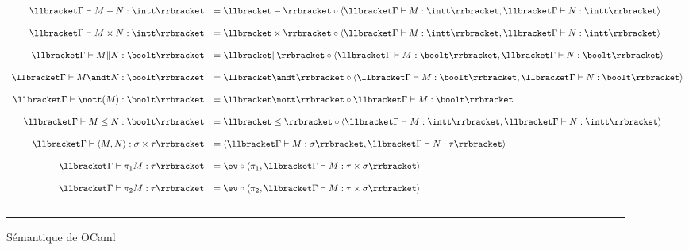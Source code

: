 \begin{figure}[p]
$$\begin{array}{rl}
        \llbracket\Gamma\vdash M - N : \intt\rrbracket &= \llbracket-\rrbracket \circ \langle\llbracket\Gamma\vdash M : \intt\rrbracket,\llbracket\Gamma\vdash N : \intt\rrbracket\rangle\\ \\
        \llbracket\Gamma\vdash M \times N : \intt\rrbracket &= \llbracket\times\rrbracket \circ \langle\llbracket\Gamma\vdash M : \intt\rrbracket,\llbracket\Gamma\vdash N : \intt\rrbracket\rangle\\ \\
        \llbracket\Gamma\vdash M \| N : \boolt\rrbracket &= \llbracket\|\rrbracket \circ \langle\llbracket\Gamma\vdash M : \boolt\rrbracket,\llbracket\Gamma\vdash N : \boolt\rrbracket\rangle\\ \\
        \llbracket\Gamma\vdash M \andt N : \boolt\rrbracket &= \llbracket\andt\rrbracket \circ \langle\llbracket\Gamma\vdash M : \boolt\rrbracket,\llbracket\Gamma\vdash N : \boolt\rrbracket\rangle\\ \\
        \llbracket\Gamma\vdash \nott (M) : \boolt\rrbracket &= \llbracket\nott\rrbracket \circ \llbracket\Gamma\vdash M : \boolt\rrbracket \\ \\
        \llbracket\Gamma\vdash M \leq N : \boolt\rrbracket &= \llbracket\leq\rrbracket \circ \langle\llbracket\Gamma\vdash M : \intt\rrbracket,\llbracket\Gamma\vdash N : \intt\rrbracket\rangle\\ \\
        \llbracket\Gamma\vdash \langle M,N\rangle : \sigma\times \tau\rrbracket &= \langle \llbracket\Gamma\vdash M : \sigma\rrbracket,\llbracket\Gamma\vdash N : \tau\rrbracket\rangle\\ \\
        \llbracket\Gamma\vdash \pi_1M : \tau\rrbracket &= \ev \circ \langle \pi_1,\llbracket\Gamma\vdash M :\tau\times\sigma\rrbracket\rangle\\ \\
        \llbracket\Gamma\vdash \pi_2M : \tau\rrbracket &= \ev \circ \langle \pi_2,\llbracket\Gamma\vdash M :\tau\times\sigma\rrbracket\rangle\\ \\
        
    \end{array}
    $$
    \rule{17cm}{0.5pt}
    \caption{Sémantique de OCaml}
    \label{semantique}
\end{figure}